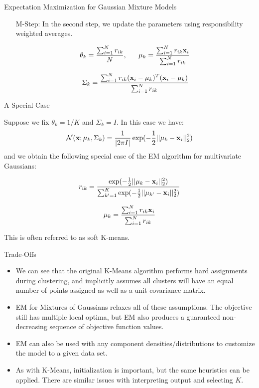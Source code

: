 \documentclass[serif,xcolor=pdftex,dvipsnames,table,hyperref={bookmarks=false,breaklinks}]{beamer}
\begin{document}
\begin{frame}[t]{Expectation Maximization for Gaussian Mixture Models}

\begin{itemize}

\item[M-Step:] In the second step, we update the parameters 
using responsibility weighted averages.

\Large
\pause $$\theta_k = \frac{\sum_{i=1}^N r_{ik}}{N}, \;\;\;\;\;\;
\mu_k = \frac{\sum_{i=1}^N r_{ik}{\mathbf{x}}_i }{\sum_{i=1}^N r_{ik}}$$

\pause $$\Sigma_k = \frac{\sum_{i=1}^N 
r_{ik}({\mathbf{x}}_i-\mu_k)^T({\mathbf{x}}_i-\mu_k) }{\sum_{i=1}^N r_{ik}}$$

\end{itemize}
\end{frame}



\begin{frame}[t]{A Special Case}

Suppose we fix $\theta_k=1/K$ and $\Sigma_k = I$. In this case we have:
\pause
$$\mathcal{N}({\mathbf{x}};\mu_{k},\Sigma_k) = 
\frac{1}{|2\pi I|}\exp(-\frac{1}{2}||\mu_k-{\mathbf{x}}_i||_2^2)$$
and we obtain the following special case of the EM algorithm for multivariate 
Gaussians:

{\Large
\pause
$$\displaystyle r_{ik} = 
\frac{\exp(-\frac{1}{2}||\mu_k-{\mathbf{x}}_i||_2^2)}{\sum_{k'=1}^K\exp(-\frac{1}{2}
||\mu_{k'}-{\mathbf{x}}_i||_2^2)}$$

\pause
$$\mu_k = \frac{\sum_{i=1}^N r_{ik}{\mathbf{x}}_i }{\sum_{i=1}^N r_{ik}}$$
}
\pause
This is often referred to as soft K-means.

\end{frame}

\begin{frame}[t]{Trade-Offs}

\begin{itemize}
\item We can see that the original K-Means algorithm performs hard assignments 
during clustering, and implicitly assumes all clusters will have an equal 
number of points assigned as well as a unit covariance matrix. 

\pause\item EM for Mixtures of Gaussians relaxes all of these assumptions. The 
objective still has multiple local optima, but EM also produces a guaranteed 
non-decreasing sequence of objective function values.

\pause\item EM can also be used with any component densities/distributions to 
customize the model to a given data set.

\pause\item As with K-Means, initialization is important, but the same 
heuristics can be applied. There are similar issues with interpreting output 
and selecting $K$.

\end{itemize}
\end{frame}
\end{document}
